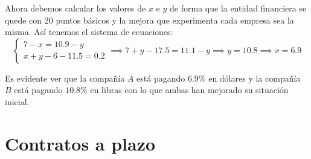 \begin{problem}[5]
Ahora debemos calcular los valores de $x$ e $y$ de forma que la entidad financiera se quede con 20 puntos básicos y la mejora que experimenta cada empresa sea la misma. Así tenemos el sistema de ecuaciones:
\[\left\{ \begin{array}{l} 7-x = 10.9-y \\ x+y-6-11.5 = 0.2 \end{array}\right. \implies 7+y-17.5 = 11.1-y \implies y = 10.8 \implies x = 6.9\]

Es evidente ver que la compañía $A$ está pagando $6.9\%$ en dólares y la compañía $B$ está pagando $10.8\%$ en libras con lo que ambas han mejorado su situación inicial.

\end{problem}

\section{Contratos a plazo}
